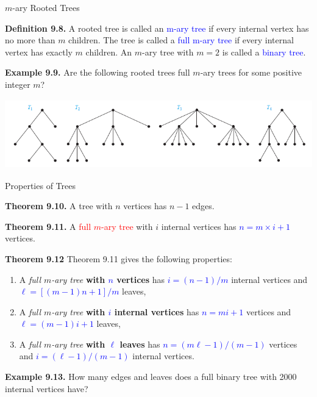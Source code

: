 \documentclass[aspectratio=169]{beamer}
\providecommand{\Blue}[1]{\textcolor{blue}{#1}}
\providecommand{\Red}[1]{\textcolor{red}{#1}}
\begin{document}
\begin{frame}[plain]{$m$-ary Rooted Trees }
  
    {\bf Definition 9.8.} A rooted tree is called an \Blue{m-ary tree} if every internal vertex has no
      more than $m$ children. The tree is called a \Blue{full m-ary tree} if every internal
      vertex has exactly $m$ children. An $m$-ary tree with $m = 2$ is called a \Blue{binary tree}.
      \medskip
      
    {\bf Example 9.9.} Are the following rooted trees full $m$-ary trees for some positive
      integer $m$?
      \begin{center}
        \includegraphics[height=3cm]{./img/lecture9-fig6.png}
      \end{center}

\end{frame}


\begin{frame}[plain]{Properties of Trees}
 
  {\bf Theorem 9.10.} A tree with $n$ vertices has $n-1$ edges. %
  \pause
  \medskip
  
   {\bf Theorem 9.11.} A \Red{full $m$-ary tree} with $i$ internal vertices
      has \Blue{$n=m\times i+1$} vertices.
      \pause
      \medskip
      
  
  
  {\bf Theorem 9.12} Theorem 9.11 gives the following properties:
    \begin{enumerate}
     \item A \emph{full $m$-ary tree} {\bf with \Blue{$n$} vertices} has \Blue{$i=(n-1)/m$} internal vertices
	and \Blue{$\ell=[(m-1)n + 1]/m$} leaves,
      \item A \emph{full $m$-ary tree} {\bf with \Blue{$i$} internal vertices} has \Blue{$n=mi+1$} vertices and
	    \Blue{$\ell=(m-1)i+1$} leaves, 
      \item A \emph{full $m$-ary tree} {\bf with \Blue{$\ell$} leaves} has \Blue{$n=(m\ell-1)/(m-1)$} vertices and
	  \Blue{$i=(\ell-1)/(m-1)$} internal vertices.
    \end{enumerate}
    \pause
    
 {\bf Example 9.13.}  How many edges and leaves does a full binary tree 
      with 2000 internal vertices have?

\end{frame}
\end{document}

